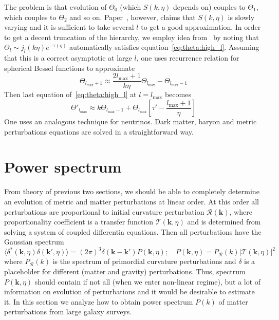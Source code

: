 \documentclass[12pt]{extarticle}
\numberwithin{problem}{section}
\numberwithin{theorem}{section}
\begin{document}
	The problem is that evolution of $\Theta_0$ (which $S(k, \eta)$ depends on) couples to $\Theta_1$, which couples to $\Theta_2$ and so on. Paper~\cite{seljak:1996}, however, claims that $S(k, \eta)$ is slowly varying and it is sufficient to take several $l$ to get a good approximation. In order to get a decent truncation of the hierarchy, we employ idea from~\cite{ma:1995} by noting that $\Theta_l\sim j_l(k\eta)e^{-\tau(\eta)}$ automatically satisfies equation~\ref{eq:theta:high_l}. Assuming that this is a correct asymptotic at large $l$, one uses recurrence relation for spherical Bessel functions to approximate
	\begin{equation}
		\Theta_{l_{\max} + 1}\approx \frac{2l_{\max} + 1}{k\eta}\Theta_{l_{\max}} - \Theta_{l_{\max} - 1}
	\end{equation}
	Then last equation of~\ref{eq:theta:high_l} at $l = l_{\max}$ becomes
	\begin{equation}
		\Theta'_{l_{\max}}\approx k\Theta_{l_{\max} - 1} + \Theta_{l_{\max}}\left[\tau' - \frac{l_{\max} + 1}{\eta}\right]
	\end{equation}
	One uses an analogous technique for neutrinos. Dark matter, baryon and metric perturbations equations are solved in a straightforward way.
	
	\section{Power spectrum}
	From theory of previous two sections, we should be able to completely determine an evolution of metric and matter perturbations at linear order. At this order all perturbations are proportional to initial curvature perturbation $\mathcal{R}(\mathbf{k})$, where proportionality coefficient is a transfer function $\mathcal{T}(\mathbf{k}, \eta)$ and is determined from solving a system of coupled differentia equations. Then all perturbations have the Gaussian spectrum
	\begin{equation}
		\langle\delta^*(\mathbf{k}, \eta)\delta(\mathbf{k}', \eta)\rangle = (2\pi)^3\delta(\mathbf{k} - \mathbf{k}')P(\mathbf{k}, \eta);\quad P(\mathbf{k}, \eta) = P_{\mathcal{R}}(k)|\mathcal{T}(\mathbf{k}, \eta)|^2
	\end{equation}
	where $P_{\mathcal{R}}(k)$ is the spectrum of primordial curvature perturbations and $\delta$ is a placeholder for different (matter and gravity) perturbations. Thus, spectrum $P(\mathbf{k}, \eta)$ should contain if not all (when we enter non-linear regime), but a lot of information on evolution of perturbations and it would be desirable to estimate it. In this section we analyze how to obtain power spectrum $P(k)$ of matter perturbations from large galaxy surveys.
	
\end{document}
